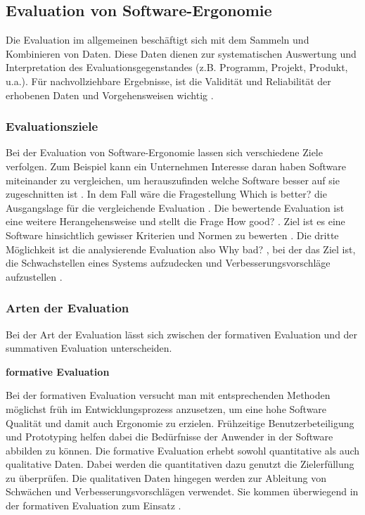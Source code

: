 \subsection{Evaluation von Software-Ergonomie}
Die Evaluation im allgemeinen beschäftigt sich mit dem Sammeln und Kombinieren von Daten. Diese Daten dienen zur systematischen Auswertung und Interpretation des Evaluationsgegenstandes (z.B. Programm, Projekt, Produkt, u.a.). Für nachvollziehbare Ergebnisse, ist die Validität und Reliabilität der erhobenen Daten und Vorgehensweisen wichtig \citep[vgl.][7]{Hegner2003}.

\subsubsection{Evaluationsziele}

Bei der Evaluation von Software-Ergonomie lassen sich verschiedene Ziele verfolgen. Zum Beispiel kann ein Unternehmen Interesse daran haben Software miteinander zu vergleichen, um herauszufinden welche Software besser auf sie zugeschnitten ist \citep[vgl.][]{Gediga2002evaluation}. In dem Fall wäre die Fragestellung \glqq Which is better?\grqq{} die Ausgangslage für die vergleichende Evaluation \citep[vgl.][9]{Hegner2003}. Die bewertende Evaluation ist eine weitere Herangehensweise und stellt die Frage \glqq How good?\grqq{} \citep[vgl.][9]{Hegner2003}. Ziel ist es eine Software hinsichtlich gewisser Kriterien und Normen zu bewerten \citep[vgl.][]{Gediga2002evaluation}. Die dritte Möglichkeit ist die analysierende Evaluation also \glqq Why bad?\grqq{} \citep[vgl.][9]{Hegner2003}, bei der das Ziel ist, die Schwachstellen eines Systems aufzudecken und Verbesserungsvorschläge aufzustellen \citep[vgl.][]{Gediga2002evaluation}.


\subsubsection{Arten der Evaluation}
Bei der Art der Evaluation lässt sich zwischen der formativen Evaluation und der summativen Evaluation unterscheiden.

\textbf{formative Evaluation}

Bei der formativen Evaluation versucht man mit entsprechenden Methoden möglichst früh im Entwicklungsprozess anzusetzen, um eine hohe Software Qualität und damit auch Ergonomie zu erzielen. Frühzeitige Benutzerbeteiligung und Prototyping helfen dabei die Bedürfnisse der Anwender in der Software abbilden zu können. Die formative Evaluation erhebt sowohl quantitative als auch qualitative Daten. Dabei werden die quantitativen dazu genutzt die Zielerfüllung zu überprüfen. Die qualitativen Daten hingegen werden zur Ableitung von Schwächen und Verbesserungsvorschlägen verwendet. Sie kommen überwiegend in der formativen Evaluation zum Einsatz \citep[vgl.][7]{Hegner2003}.

